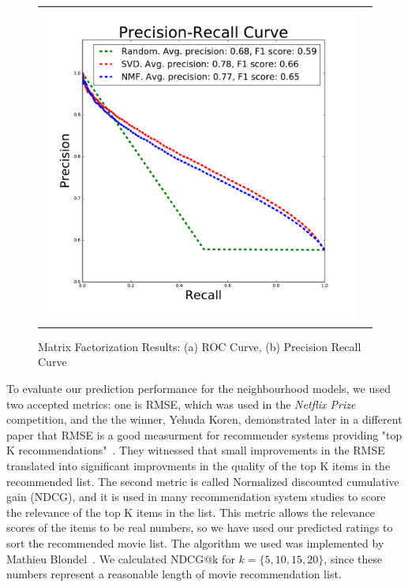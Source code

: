 \begin{figure}[t]
{\begin{tabular}{c c}
  \includegraphics{figures/precision_recall_curve.pdf} \\
\end{tabular}
}
\caption{Matrix Factorization Results: (a) ROC Curve, (b) Precision Recall Curve}
\label{fig:matrix_curves}  
\end{figure}


To evaluate our prediction performance for the neighbourhood models, we used two accepted metrics: one is RMSE, which was used in the \textit{Netflix Prize} competition, and the the winner, Yehuda Koren, demonstrated later in a different paper that RMSE is a good measurment for recommender systems providing "top K recommendations"~\cite{koren2008factorization}. They witnessed that small improvements in the RMSE translated into significant improvments in the quality of the top K items in the recommended list. The second metric is called Normalized discounted cumulative gain (NDCG), and it is used in many recommendation system studies to score the relevance of the top K items in the list. This metric allows the relevance scores of the items to be real numbers, so we have used our predicted ratings to sort the recommended movie list. The algorithm we used was implemented by Mathieu Blondel~\cite{letorMetrics}. We calculated NDCG@k for $k=\{5, 10, 15, 20\}$, since these numbers represent a reasonable length of movie recommendation list.


